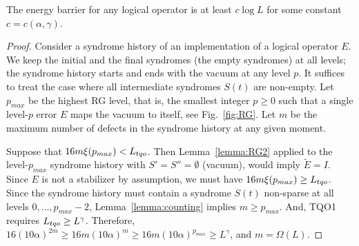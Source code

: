 \begin{theorem}
\label{thm:lop-log-energy-barrier}
The energy barrier for any logical operator is at least $c \log{L}$ for some constant $c=c(\alpha,\gamma)$.
\end{theorem}
\begin{proof}
Consider a syndrome history of an implementation of a logical operator $E$.
We keep the initial and the final syndromes (the empty syndromes) at all levels;
the syndrome history starts and ends with the vacuum at any level $p$.
It suffices to treat the case where
all intermediate syndromes $S(t)$ are non-empty.
Let $p_{max}$ be the highest RG level, that is, the smallest integer $p \ge 0$
such that a single level-$p$ error $E$ maps the vacuum to itself, see Fig.~\ref{fig:RG}.
Let $m$ be the maximum number of defects in the syndrome history at any given moment.

Suppose that $16m \xi(p_{max}) < {L_{tqo}}$.
Then Lemma~\ref{lemma:RG2} applied to the level-$p_{max}$ syndrome history
with $S'=S''=\emptyset$ (vacuum),
would imply $\tilde{E}=I$.
Since $E$ is not a stabilizer by assumption, we must have $16 m \xi(p_{max}) \ge {L_{tqo}}$.
Since the syndrome history must contain a syndrome $S(t)$ non-sparse at all levels $0,\ldots,p_{max}-2$,
Lemma~\ref{lemma:counting} implies $m \ge p_{max}$.
And, TQO1 requires ${L_{tqo}} \ge L^\gamma$.
Therefore, $ 16(10\alpha)^{2m} \ge 16m(10\alpha)^m \ge 16 m (10\alpha)^{p_{max}} \ge L^\gamma $,
and $m = \Omega(L)$.
\end{proof}

